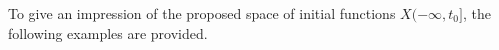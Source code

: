 \documentclass{svproc}
\renewenvironment{proof}[1][Proof]{\par\noindent\textbf{#1.} }{\hfill$\square$\par\vspace{1em}}
\begin{document}

To give an impression of the proposed space of initial functions $X(-\infty,t_0]$, the following examples are provided.
\end{document}

